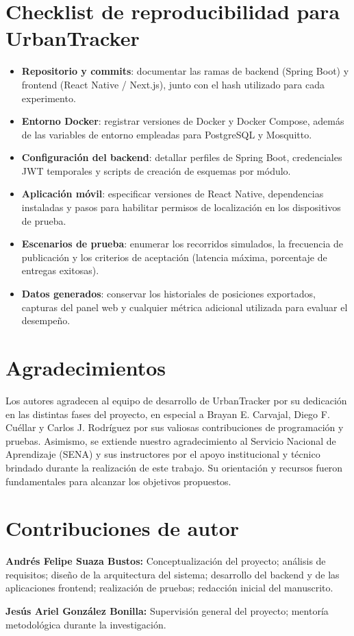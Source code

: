 \appendix
\section{Checklist de reproducibilidad para UrbanTracker}
\begin{itemize}[leftmargin=*]
  \item \textbf{Repositorio y commits}: documentar las ramas de backend (Spring Boot) y frontend (React Native / Next.js), junto con el hash utilizado para cada experimento.
  \item \textbf{Entorno Docker}: registrar versiones de Docker y Docker Compose, además de las variables de entorno empleadas para PostgreSQL y Mosquitto.
  \item \textbf{Configuración del backend}: detallar perfiles de Spring Boot, credenciales JWT temporales y scripts de creación de esquemas por módulo.
  \item \textbf{Aplicación móvil}: especificar versiones de React Native, dependencias instaladas y pasos para habilitar permisos de localización en los dispositivos de prueba.
  \item \textbf{Escenarios de prueba}: enumerar los recorridos simulados, la frecuencia de publicación y los criterios de aceptación (latencia máxima, porcentaje de entregas exitosas).
  \item \textbf{Datos generados}: conservar los historiales de posiciones exportados, capturas del panel web y cualquier métrica adicional utilizada para evaluar el desempeño.
\end{itemize}

\section{Agradecimientos}
Los autores agradecen al equipo de desarrollo de UrbanTracker por su dedicación en las distintas fases del proyecto, en especial a Brayan E. Carvajal, Diego F. Cuéllar y Carlos J. Rodríguez por sus valiosas contribuciones de programación y pruebas. Asimismo, se extiende nuestro agradecimiento al Servicio Nacional de Aprendizaje (SENA) y sus instructores por el apoyo institucional y técnico brindado durante la realización de este trabajo. Su orientación y recursos fueron fundamentales para alcanzar los objetivos propuestos.

\section{Contribuciones de autor}
\textbf{Andrés Felipe Suaza Bustos:} Conceptualización del proyecto; análisis de requisitos; diseño de la arquitectura del sistema; desarrollo del backend y de las aplicaciones frontend; realización de pruebas; redacción inicial del manuscrito.

\textbf{Jesús Ariel González Bonilla:} Supervisión general del proyecto; mentoría metodológica durante la investigación.
